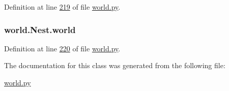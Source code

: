 Definition at line \hyperlink{world_8py_source_l00219}{219} of file \hyperlink{world_8py_source}{world.\+py}.

\hypertarget{classworld_1_1Nest_a624fe0079926173a6356a3d59410dcf3}{
\subsubsection[{world}]{\setlength{\rightskip}{0pt plus 5cm}world.\+Nest.\+world}}\label{classworld_1_1Nest_a624fe0079926173a6356a3d59410dcf3}


Definition at line \hyperlink{world_8py_source_l00220}{220} of file \hyperlink{world_8py_source}{world.\+py}.



The documentation for this class was generated from the following file\+:\begin{DoxyCompactItemize}
\item 
\hyperlink{world_8py}{world.\+py}\end{DoxyCompactItemize}
